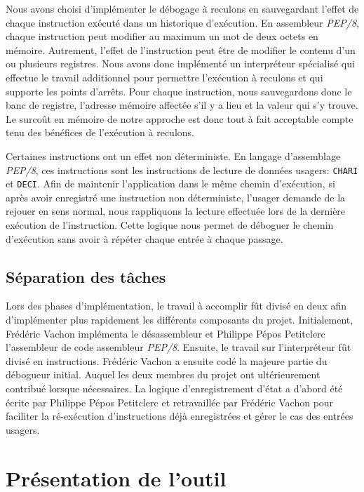 \documentclass{article}
\begin{document}
Nous avons choisi d'implémenter le
débogage à reculons en sauvegardant l'effet de chaque instruction
exécuté dans un historique d'exécution. En assembleur \emph{PEP/8},
chaque instruction peut modifier au maximum un mot de deux octets en
mémoire. Autrement, l'effet de l'instruction peut être de modifier le
contenu d'un ou plusieurs registres. Nous avons donc implémenté un
interpréteur spécialisé qui effectue le travail additionnel pour
permettre l'exécution à reculons et qui supporte les points d'arrêts.
Pour chaque instruction, nous sauvegardons donc le banc de registre,
l'adresse mémoire affectée s'il y a lieu et la valeur qui s'y trouve. Le
surcoût en mémoire de notre approche est donc tout à fait acceptable
compte tenu des bénéfices de l'exécution à reculons.

Certaines instructions ont un effet non déterministe. En langage
d'assemblage \emph{PEP/8}, ces instructions sont les instructions de
lecture de données usagers: \texttt{CHARI} et \texttt{DECI}. Afin de
maintenir l'application dans le même chemin d'exécution, si après avoir
enregistré une instruction non déterministe, l'usager demande de la
rejouer en sens normal, nous rappliquons la lecture effectuée lors de la
dernière exécution de l'instruction. Cette logique nous permet de
déboguer le chemin d'exécution sans avoir à répéter chaque entrée à
chaque passage.

\subsection{Séparation des tâches}\label{suxe9paration-des-tuxe2ches}

Lors des phases d'implémentation, le travail à accomplir fût divisé en
deux afin d'implémenter plus rapidement les différents composants du
projet. Initialement, Frédéric Vachon implémenta le désassembleur et
Philippe Pépos Petitclerc l'assembleur de code assembleur \emph{PEP/8}.
Ensuite, le travail sur l'interpréteur fût divisé en instructions.
Frédéric Vachon a ensuite codé la majeure partie du débogueur initial.
Auquel les deux membres du projet ont ultérieurement contribué lorsque
nécessaires. La logique d'enregistrement d'état a d'abord été écrite par
Philippe Pépos Petitclerc et retravaillée par Frédéric Vachon pour
faciliter la ré-exécution d'instructions déjà enregistrées et gérer le
cas des entrées usagers.

\section{Présentation de l'outil}\label{pruxe9sentation-de-loutil}
\end{document}
